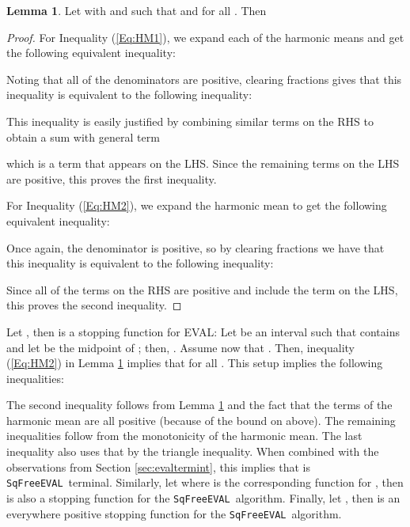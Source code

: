 \documentclass{amsart}
\theoremstyle{definition}
\newtheorem{lemma}{Lemma}[section]
\newcommand{\EVAL}{\texttt{SqFreeEVAL}}
\begin{document}
\begin{lemma}\label{lem:HM}
Let  with  and  such that  and  for all .  Then

\begin{proof}
For Inequality (\ref{Eq:HM1}), we expand each of the harmonic means and get the following equivalent inequality:

Noting that all of the denominators are positive, clearing fractions gives that this inequality is equivalent to the following inequality:

This inequality is easily justified by combining similar terms on the RHS to obtain a sum with general term

which is a term that appears on the LHS.  Since the remaining terms on the LHS are positive, this proves the first inequality.

For Inequality (\ref{Eq:HM2}), we expand the harmonic mean to get the following equivalent inequality:

Once again, the denominator is positive, so by clearing fractions we have that this inequality is equivalent to the following inequality:

Since all of the terms on the RHS are positive and include the term on the LHS, this proves the second inequality.
\end{proof}
\end{lemma}

Let , then  is a stopping function for EVAL: Let  be an interval such that  contains  and let  be the midpoint of ; then, .  Assume now that .  Then, inequality (\ref{Eq:HM2}) in Lemma \ref{lem:HM} implies that  for all .  This setup implies the following inequalities:

The second inequality follows from Lemma \ref{lem:HM} and the fact that the terms of the harmonic mean  are all positive (because of the bound on  above).  The remaining inequalities follow from the monotonicity of the harmonic mean.  The last inequality also uses that  by the triangle inequality.  When combined with the observations from Section \ref{sec:evaltermint}, this implies that  is \EVAL\ terminal.  Similarly, let  where  is the corresponding function for , then  is also a stopping function for the \EVAL\ algorithm.  Finally, let , then  is an everywhere positive stopping function for the \EVAL\ algorithm.
\end{document}
